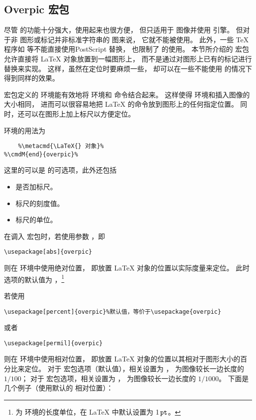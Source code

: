 \subsection{Overpic 宏包}\label{ssec:overpic}

尽管  的功能十分强大，使用起来也很方便，
但只适用于  图像并使用  引擎。
但对于非  图形或标记并非标准字符串的  图来说，
它就不能被使用。
此外，一些 \TeX{} 程序如  \pdfLaTeX{} 等不能直接使用PostScript 替换，
也限制了  的使用。
本节所介绍的  宏包允许直接将 \LaTeX{} 对象放置到一幅图形上，
而不是通过对图形上已有的标记进行替换来实现。
这样，虽然在定位时要麻烦一些，
却可以在一些不能使用  的情况下得到同样的效果。

 宏包定义的  环境能有效地将  环境和  命令结合起来。
这样使得  环境和插入图像的大小相同，
进而可以很容易地把 \LaTeX{} 的命令放到图形上的任何指定位置。
同时，还可以在图形上加上标尺以方便定位。

 环境的用法为
\begin{lstlisting}[escapechar=\%]
%\cmdMOM{begin}{overpic}{\metacmd{选项}}{\metacmd{图形}}%
	%\metacmd{\LaTeX{} 对象}%
%\cmdM{end}{overpic}%
\end{lstlisting}
这里的可以是  的可选项，此外还包括
\begin{itemize}
	\item {} 是否加标尺。
	\item {} 标尺的刻度值。
	\item {} 标尺的单位。
\end{itemize}

在调入  宏包时，若使用参数 ，即
\begin{lstlisting}
\usepackage[abs]{overpic}
\end{lstlisting}
则在  环境中使用绝对位置，
即放置 \LaTeX{} 对象的位置以实际度量来定位。
此时  选项的默认值为 ，\footnote{%
	 为  环境的长度单位，在 \LaTeX{} 中默认设置为 $1\,\mathtt{pt}$。}


若使用
\begin{lstlisting}
\usepackage[percent]{overpic}%默认值，等价于\usepackage{overpic}
\end{lstlisting}
或者
\begin{lstlisting}
\usepackage[permil]{overpic}
\end{lstlisting}
则在  环境中使用相对位置，
即放置 \LaTeX{} 对象的位置以其相对于图形大小的百分比来定位。
对于  宏包选项（默认值），相关设置为 ，
 为图像较长一边长度的 $1/100$；
对于  宏包选项，相关设置为 ，
 为图像较长一边长度的 $1/1000$。
下面是几个例子（使用默认的  相对位置）：

